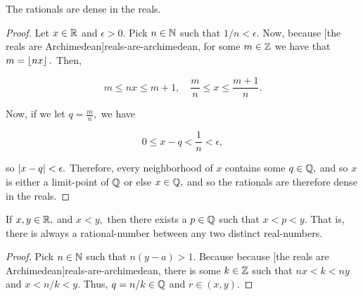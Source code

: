 \documentclass{article}
\begin{document}
\begin{theorem}\label{rationals-are-dense-in-reals}
The \@{rationals} are \@{dense} in the \@{reals}.
\end{theorem}

\begin{proof}
Let $x \in \mathbb{R}$ and $\epsilon > 0.$ Pick $n \in \mathbb{N}$ such that $1/n < \epsilon.$ Now, because \@[the reals are Archimedean]{reals-are-archimedean}, for some $m \in \mathbb{Z}$ we have that $m = \left\lfloor nx \right\rfloor.$ Then,

\[ m \leq nx \leq m+1, \quad \frac{m}{n} \leq x \leq \frac{m+1}{n}. \]

Now, if we let $q = \frac{m}{n},$ we have

\[ 0 \leq x - q < \frac{1}{n} < \epsilon, \]

so $\left| x - q \right| < \epsilon.$ Therefore, every \@{neighborhood} of $x$ contains some $q \in \mathbb{Q},$ and so $x$ is either a \@{limit-point} of $\mathbb{Q}$ or else $x \in \mathbb{Q},$ and so the rationals are therefore \@{dense} in the reals.
\end{proof}

\begin{corollary}\label{rational-between-any-two-reals}
If $x, y \in \mathbb{R},$ and $x < y,$ then there exists a $p \in \mathbb{Q}$ such that $x < p < y.$ That is, there is always a \@{rational-number} between any two distinct \@{real-numbers}.
\end{corollary}

\begin{proof}
Pick $n \in \mathbb{N}$ such that $n(y - a) > 1.$ Because because \@[the reals are Archimedean]{reals-are-archimedean}, there is some $k \in \mathbb{Z}$ such that $nx < k < ny$ and $x < n/k < y.$ Thus, $q = n/k \in \mathbb{Q}$ and $r \in (x, y).$
\end{proof}
\end{document}
